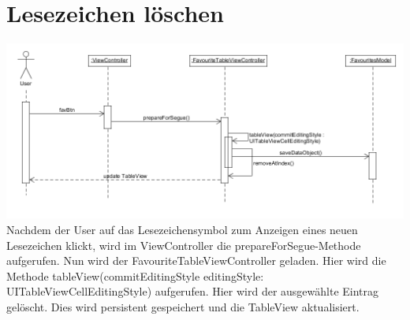 \documentclass[a4paper,10pt]{article}
\begin{document}
\section{Lesezeichen löschen}
\includegraphics[scale=0.45]{sequDeleteFavourites.png}
Nachdem der User auf das Lesezeichensymbol zum Anzeigen eines neuen Lesezeichen klickt, wird im ViewController die prepareForSegue-Methode aufgerufen. Nun wird der FavouriteTableViewController geladen. Hier wird die Methode tableView(commitEditingStyle editingStyle: UITableViewCellEditingStyle) aufgerufen. Hier wird der ausgewählte Eintrag gelöscht. Dies wird persistent gespeichert und die TableView aktualisiert.
\pagebreak
\end{document}
